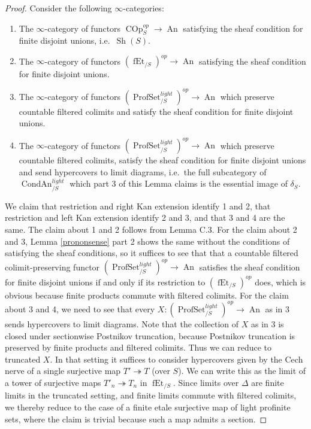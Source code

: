 \documentclass[12pt]{article}
\newcommand{\on}{\operatorname}
\begin{document}
\begin{proof}
Consider the following $\infty$-categories:
\begin{enumerate}
\item The $\infty$-category of functors $\on{COp}_S^{op}\rightarrow\on{An}$ satisfying the sheaf condition for finite disjoint unions, i.e.\ $\on{Sh}(S)$.
\item The $\infty$-category of functors $(\on{fEt}_{/S})^{op}\rightarrow\on{An}$ satisfying the sheaf condition for finite disjoint unions.
\item The $\infty$-category of functors $(\on{ProfSet}^{light}_{/S})^{op}\rightarrow\on{An}$ which preserve countable filtered colimits and satisfy the sheaf condition for finite disjoint unions.
\item The $\infty$-category of functors $(\on{ProfSet}^{light}_{/S})^{op}\rightarrow\on{An}$ which preserve countable filtered colimits, satisfy the sheaf condition for finite disjoint unions and send hypercovers to limit diagrams, i.e.\ the full subcategory of $\on{CondAn}^{light}_{/S}$ which part 3 of this Lemma claims is the essential image of $\delta_S$.
\end{enumerate}
We claim that restriction and right Kan extension identify 1 and 2, that restriction and left Kan extension identify 2 and 3, and that 3 and 4 are the same.  The claim about 1 and 2 follows from \cite{HoyoisLefschetz} Lemma C.3.  For the claim about 2 and 3, Lemma \ref{prononsense} part 2 shows the same without the conditions of satisfying the sheaf conditions, so it suffices to see that that a countable filtered colimit-preserving functor $(\on{ProfSet}^{light}_{/S})^{op}\rightarrow\on{An}$ satisfies the sheaf condition for finite disjoint unions if and only if its restriction to $(\on{fEt}_{/S})^{op}$ does, which is obvious because finite products commute with filtered colimits.  For the claim about 3 and 4, we need to see that every $X:(\on{ProfSet}^{light}_{/S})^{op}\rightarrow\on{An}$ as in 3 sends hypercovers to limit diagrams.  Note that the collection of $X$ as in 3 is closed under sectionwise Postnikov truncation, because Postnikov truncation is preserved by finite products and filtered colimits.  Thus we can reduce to truncated $X$.  In that setting it suffices to consider hypercovers given by the Cech nerve of a single surjective map $T'\twoheadrightarrow T$ (over $S$).  We can write this as the limit of a tower of surjective maps $T'_n\twoheadrightarrow T_n$ in $\on{fEt}_{/S}$.  Since limits over $\Delta$ are finite limits in the truncated setting, and finite limits commute with filtered colimits, we thereby reduce to the case of a finite etale surjective map of light profinite sets, where the claim is trivial because such a map admits a section.


\end{proof}
\end{document}
